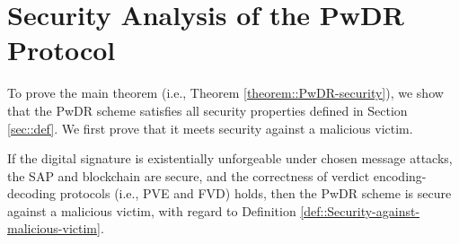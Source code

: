 

\section{Security Analysis of the PwDR Protocol}

To prove the main theorem (i.e., Theorem \ref{theorem::PwDR-security}), we show that the PwDR scheme satisfies all security properties defined in Section \ref{sec::def}. We first prove that it meets security against a malicious victim. 


\begin{lemma} If the digital signature is existentially unforgeable under chosen message attacks, the SAP and  blockchain are secure, and the correctness of verdict encoding-decoding protocols (i.e., PVE and FVD) holds, then the PwDR scheme is secure against a malicious victim, with regard to Definition \ref{def::Security-against-malicious-victim}. 
\end{lemma}

